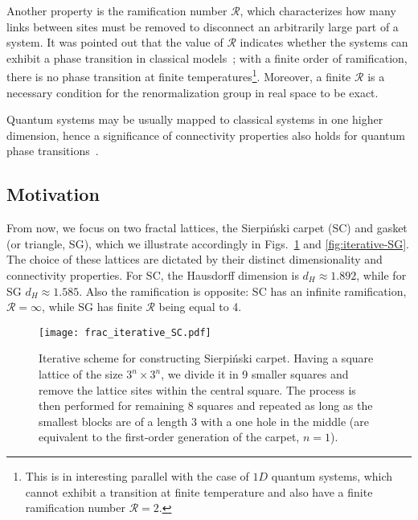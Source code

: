 Another property is the ramification number $\mathcal{R}$, which characterizes how many links between sites must be removed to disconnect an arbitrarily large part of a system. It was pointed out that the value of $\mathcal{R}$ indicates whether the systems can exhibit a phase transition in classical models~\cite{Gefen_1984_1}; with a finite order of ramification, there is no phase transition at finite temperatures\footnote{This is in interesting parallel with the case of $1D$ quantum systems, which cannot exhibit a transition at finite temperature and also have a finite ramification number $\mathcal{R} = 2$.}. Moreover, a finite $\mathcal{R}$ is a necessary condition for the renormalization group in real space to be exact.

Quantum systems may be usually mapped to classical systems in one higher dimension, hence a significance of connectivity properties also holds for quantum phase transitions~\cite{sachdev_2011}.
 
\subsection{Motivation}
From now, we focus on two fractal lattices, the Sierpiński carpet (SC) and gasket (or triangle, SG), which we illustrate accordingly in Figs.~\ref{fig:iterative-SC} and \ref{fig:iterative-SG}. The choice of these lattices are dictated by their distinct dimensionality and connectivity properties. For SC, the Hausdorff dimension is $d_{H} \approx 1.892$, while for SG $d_H \approx 1.585$. Also the ramification is opposite: SC has an infinite ramification, $\mathcal{R} = \infty$, while SG has finite $\mathcal{R}$ being equal to 4. 

\begin{figure}[H]
\centering
\texttt{[image: frac\_iterative\_SC.pdf]} 
\caption[Iterative scheme for constructing Sierpiński carpet]{Iterative scheme for constructing Sierpiński carpet. Having a square lattice of the size $3^n \times 3^n$, we divide it in 9 smaller squares and remove the lattice sites within the central square. The process is then performed for remaining 8 squares and repeated as long as the smallest blocks are of a length $3$ with a one hole in the middle (are equivalent to the first-order generation of the carpet, $n = 1$).}
\label{fig:iterative-SC}
\end{figure}

